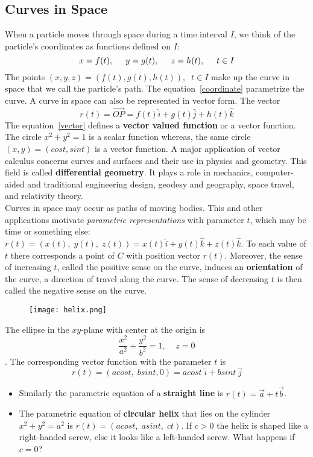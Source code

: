 \documentclass[aima331_lecturenotes_ku.tex]{subfiles}
\begin{document}
\subsection{Curves in Space}
When a particle moves through space during a time interval $I$, we think of the particle's coordinates as functions defined on $I$:
\begin{equation}
  \label{coordinate}
  x=f(t), \hspace{5mm} y=g(t), \hspace{5mm} z=h(t), \hspace{5mm} t \in I
\end{equation}
The points $(x,y,z)=(f(t),g(t),h(t)), \;\; t \in I$ make up the curve in space that we call the particle's path. The equation~\ref{coordinate} parametrize the curve. A curve in space can also be represented in vector form. The vector
\begin{equation}
  \label{vector}
  r(t) = \vec{OP} = f(t)\hat{i} + g(t)\hat{j} + h(t)\hat{k}
\end{equation}
The equation~\ref{vector} defines a \textbf{vector valued function} or a vector function. The circle $x^2 + y^2 = 1$ is a scalar function whereas, the same circle $(x,y) = (cost, sint)$ is a vector function.
A major application of vector calculus concerns curves and surfaces and their use in physics and geometry. This field is called \textbf{differential geometry}. It plays a role in mechanics, computer-aided and traditional engineering design, geodesy and geography, space travel, and relativity theory.\\
Curves in space may occur as paths of moving bodies. This and other applications motivate \textit{parametric representations} with parameter $t$, which may be time or something else: $r(t)=(x(t), \; y(t), \; z(t)) = x(t)\hat{i} + y(t)\hat{k} + z(t)\hat{k}$. To each value of $t$ there corresponds a point of $C$ with position vector $r(t)$. Moreover, the sense of increasing $t$, called the positive sense on the curve, induces an \textbf{orientation} of the curve, a direction of travel along the curve. The sense of decreasing $t$ is then called the negative sense on the curve.
\begin{wrapfigure}{r}{0.24\textwidth}
  \centering
  \texttt{[image: helix.png]}
  \label{fig:img1}
\end{wrapfigure}

\begin{example}
  The ellipse in the $xy$-plane with center at the origin is $$\frac{x^2}{a^2} + \frac{y^2}{b^2}  = 1, \;\;\;\; z=0$$. The corresponding vector function with the parameter $t$ is $$r(t) = (acost, \; bsint, 0)= acost \;\hat{i} + bsint \;\hat{j}$$
  \begin{itemize}
  \item Similarly the parametric equation of a \textbf{straight line} is $r(t) = \vec{a} + t\vec{b}$.
  \item The parametric equation of \textbf{circular helix} that lies on the cylinder $x^2+y^2=a^2$ is $r(t)=(acost, \; asint, \;ct)$. If $c>0$ the helix is shaped like a right-handed screw, else it looks like a left-handed screw. What happens if $c=0$?
  \end{itemize}
\end{example}
\end{document}
